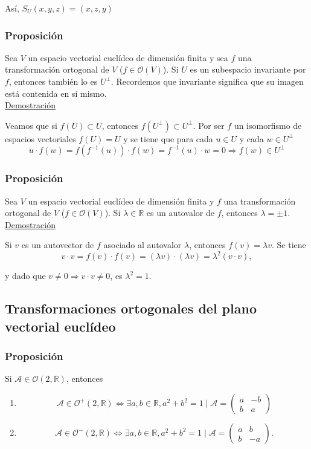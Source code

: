 \documentclass[12pt, a4paper, ones, notitlepage, openany,titlepage]{article}
\newcommand{\demostracion}{\noindent\underline{Demostración}}
\begin{document}
\noindent Así, $S_{U}(x, y, z)=(x, z, y)$

\subsubsection{Proposición}
Sea $V$ un espacio vectorial euclídeo de dimensión finita y sea $f$ una transformación ortogonal de $V$ ($f \in \mathcal{O}(V)$). Si $U$ es un subespacio invariante por $f$, entonces también lo es $U^{\perp}$. Recordemos que invariante significa que su imagen está contenida en sí mismo.\\

\demostracion

Veamos que si $f(U) \subset U$, entonces $f\left(U^{\perp}\right) \subset U^{\perp}$. Por ser $f$ un isomorfismo de espacios vectoriales $f(U)=U$ y se tiene que para cada $u \in U$ y cada $w \in U^{\perp}$
$$
u \cdot f(w)=f\left(f^{-1}(u)\right) \cdot f(w)=f^{-1}(u) \cdot w=0 \Longrightarrow f(w) \in U^\perp
$$

\subsubsection{Proposición}
Sea $V$ un espacio vectorial euclídeo de dimensión finita y $f$ una transformación ortogonal de $V$ ($f \in \mathcal{O}(V)$). Si $\lambda \in \mathbb{R}$ es un autovalor de $f$, entonces $\lambda= \pm 1$.\\

\demostracion

Si $v$ es un autovector de $f$ asociado al autovalor $\lambda$, entonces $f(v)=\lambda v$. Se tiene
$$
v \cdot v=f(v) \cdot f(v)=(\lambda v) \cdot(\lambda v)=\lambda^{2} (v \cdot v),
$$

\noindent y dado que $v \neq 0 \Longrightarrow v \cdot v \neq 0$, es $\lambda^{2}=1$.

\subsection{Transformaciones ortogonales del plano vectorial euclídeo}
\subsubsection{Proposición}
Si $\mathcal{A} \in \mathcal{O}(2, \mathbb{R})$, entonces
\begin{enumerate}[label=(\arabic*)]
	\item 
	$$
	\mathcal{A} \in \mathcal{O}^{+}(2, \mathbb{R}) \Longleftrightarrow \exists a, b \in \mathbb{R}, a^{2}+b^{2}=1 \mid \mathcal{A}=\left(\begin{array}{rr}
		a & -b \\
		b & a
	\end{array}\right)
	$$
	\item
	$$
	\mathcal{A} \in \mathcal{O}^{-}(2, \mathbb{R}) \Longleftrightarrow \exists a, b \in \mathbb{R}, a^{2}+b^{2}=1 \mid \mathcal{A}=\left(\begin{array}{rr}
		a & b \\
		b & -a
	\end{array}\right) .
	$$
\end{enumerate}
\end{document}
